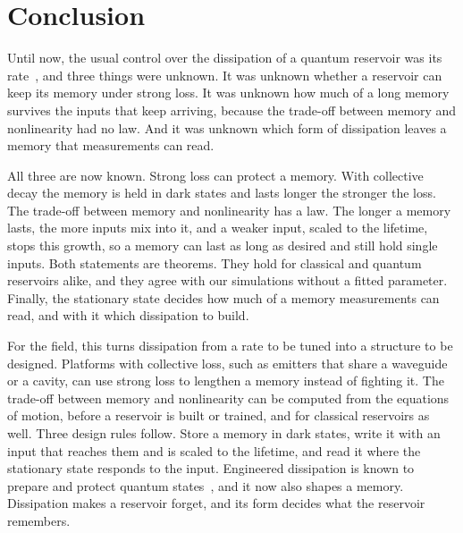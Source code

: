 \section{Conclusion}
\label{sec:conclusion}
Until now, the usual control over the dissipation of a quantum reservoir was its
rate~\cite{Sannia2024,Goetting2025}, and three things were unknown. It was unknown whether a reservoir can keep its
memory under strong loss. It was unknown how much of a long memory survives the inputs that keep arriving, because
the trade-off between memory and nonlinearity had no law. And it was unknown which form of dissipation leaves a
memory that measurements can read.

All three are now known. Strong loss can protect a memory. With collective decay the memory is held in dark states
and lasts longer the stronger the loss. The trade-off between memory and nonlinearity has a law. The longer a memory
lasts, the more inputs mix into it, and a weaker input, scaled to the lifetime, stops this growth, so a memory can
last as long as desired and still hold single inputs. Both statements are theorems. They hold for classical and
quantum reservoirs alike, and they agree with our simulations without a fitted parameter. Finally, the stationary
state decides how much of a memory measurements can read, and with it which dissipation to build.

For the field, this turns dissipation from a rate to be tuned into a structure to be designed. Platforms with
collective loss, such as emitters that share a waveguide or a cavity, can use strong loss to lengthen a memory
instead of fighting it. The trade-off between memory and nonlinearity can be computed from the equations of motion,
before a reservoir is built or trained, and for classical reservoirs as well. Three design rules follow. Store a
memory in dark states, write it with an input that reaches them and is scaled to the lifetime, and read it where the
stationary state responds to the input. Engineered dissipation is known to prepare and protect quantum
states~\cite{Poyatos1996,Verstraete2009}, and it now also shapes a memory. Dissipation makes a reservoir forget, and
its form decides what the reservoir remembers.
